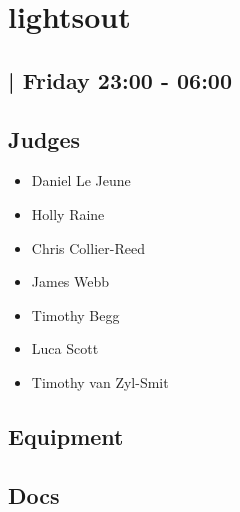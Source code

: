 \documentclass[10pt]{article}
\begin{document}
		\begin{minipage}{\linewidth}
		\setcounter{section}{9}
	\section{lightsout }
	\subsection*{ | Friday 23:00 - 06:00}

	

	\begin{multicols}{2}
	\subsection*{\faUsers \: Judges}
	\begin{itemize}
			\item Daniel Le Jeune
			\item Holly Raine
			\item Chris Collier-Reed
			\item James Webb
			\item Timothy Begg
			\item Luca Scott
			\item Timothy van Zyl-Smit
		\end{itemize}
	\columnbreak
	\subsection*{\faWrench \: Equipment}
	        \vfill\null
        \subsection*{\faFile \: Docs}
     	\end{multicols}


	\vspace{1cm}
	\end{minipage}
\end{document}
